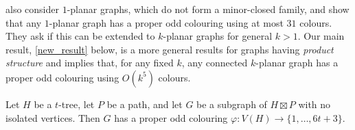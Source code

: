 \documentclass{patmorin}
\begin{document}
\citet{cranston.lafferty.ea:note} also consider $1$-planar graphs, which do not form a minor-closed family, and show that any $1$-planar graph has a proper odd colouring using at most $31$ colours.  They ask if this can be extended to $k$-planar graphs for general $k>1$.  Our main result, \cref{new_result} below, is a more general results for graphs having \emph{product structure} and implies that, for any fixed $k$, any connected $k$-planar graph has a proper odd colouring using $O(k^5)$ colours.
%

\begin{thm}\label{new_result}
  Let $H$ be a $t$-tree, let $P$ be a path, and let $G$ be a subgraph of $H\boxtimes P$ with no isolated vertices. Then $G$ has a proper odd colouring $\varphi:V(H)\to\{1,\ldots,6t+3\}$.
\end{thm}
\end{document}
